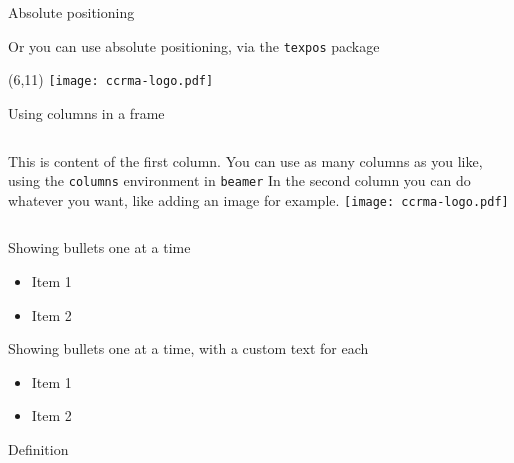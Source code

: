 \documentclass{beamer}
\begin{document}
\begin{frame}{Absolute positioning}

    Or you can use absolute positioning, via the \texttt{texpos} package



    \begin{textblock}{20}(6,11)
      \texttt{[image: ccrma-logo.pdf]}
    \end{textblock}


\end{frame}



\begin{frame}{Using columns in a frame}
    \begin{columns}[t]
            This is content of the first column. You can use as many columns as you like, using the \texttt{columns} environment in \texttt{beamer}
            In the second column you can do whatever you want, like adding an image for example.
            \texttt{[image: ccrma-logo.pdf]}
    \end{columns}
\end{frame}



\begin{frame}
    Showing bullets one at a time
    \begin{itemize}[<+->]
        \item Item 1
        \item Item 2
    \end{itemize}
\end{frame}




\begin{frame}
    Showing bullets one at a time, with a custom text for each
    \begin{itemize}[<+->]
        \item Item 1
        \item Item 2
    \end{itemize}

    \begin{block}{Definition}
    \end{block}

\end{frame}
\end{document}
